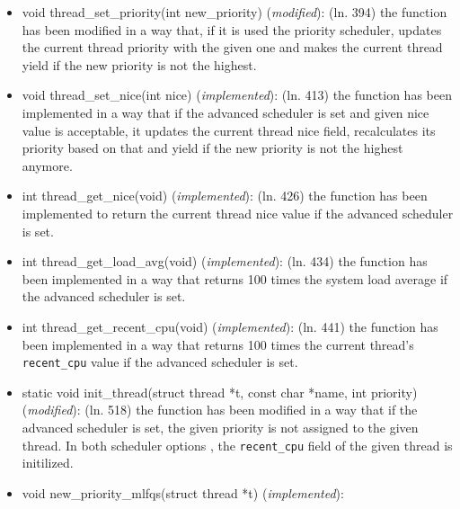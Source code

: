 \documentclass[11pt]{scrartcl}
\begin{document}
\begin{itemize}
	\item void thread\_set\_priority(int new\_priority) (\textit{modified}): \newline 
	(ln. 394) the function has been modified in a way that, if it is used the priority scheduler, updates the current thread priority with the given one and makes the current thread yield if the new priority is not the highest.
	
	\item void thread\_set\_nice(int nice) (\textit{implemented}): \newline 
	(ln. 413) the function has been implemented in a way that if the advanced scheduler is set and given nice value is acceptable, it updates the current thread nice field, recalculates its priority based on that and yield if the new priority is not the highest anymore.
	\item  int thread\_get\_nice(void) (\textit{implemented}): \newline 
	(ln. 426) the function has been implemented to return the current thread nice value if the advanced scheduler is set.
	\item int thread\_get\_load\_avg(void) (\textit{implemented}): \newline
	(ln. 434) the function has been implemented in a way that returns 100 times the system load average if the advanced scheduler is set.
	\item int thread\_get\_recent\_cpu(void) (\textit{implemented}): \newline
	(ln. 441) the function has been implemented in a way that returns 100 times the current thread's \texttt{recent\_cpu} value if the advanced scheduler is set.
	\item static void init\_thread(struct thread *t, const char *name, int priority) (\textit{modified}): \newline
	(ln. 518) the function has been modified in a way that if the advanced scheduler is set, the given priority is not assigned to the given thread. In both scheduler options , the \texttt{recent\_cpu} field of the given thread is initilized.
	\item void new\_priority\_mlfqs(struct thread *t) (\textit{implemented}): \newline
	
	

\end{itemize}
\end{document}

